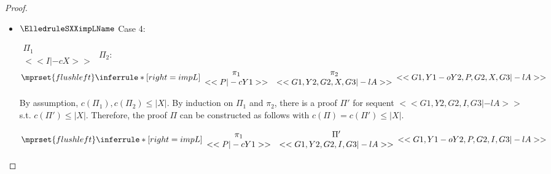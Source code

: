 \begin{proof}
\begin{enumerate}
\begin{itemize}
  \item $\ElledruleSXXimpLName$ Case 4:
      \begin{center}
        \scriptsize
        \begin{math}
          \begin{array}{c}
            \Pi_1 \\
            {<<I |-c X>>}
          \end{array}
        \end{math}
        \qquad\qquad
        $\Pi_2$:
        \begin{math}
          $$\mprset{flushleft}
          \inferrule* [right={\tiny impL}] {
            {
              \begin{array}{cc}
                \pi_1 & \pi_2 \\
                {<<P |-c Y1>>} & {<<G1, Y2, G2, X, G3 |-l A>>}
              \end{array}
            }
          }{<<G1, Y1 -o Y2, P, G2, X, G3 |-l A>>}
        \end{math}
      \end{center}
      By assumption, $c(\Pi_1),c(\Pi_2)\leq |X|$. By induction on $\Pi_1$ and $\pi_2$, there is
      a proof $\Pi'$ for sequent $<<G1, Y2, G2, I, G3 |-l A>>$ s.t. $c(\Pi') \leq |X|$.
      Therefore, the proof $\Pi$ can be constructed as follows with
      $c(\Pi) = c(\Pi') \leq |X|$.
      \begin{center}
        \scriptsize
        \begin{math}
          $$\mprset{flushleft}
          \inferrule* [right={\tiny impL}] {
            {
              \begin{array}{cc}
                \pi_1 & \Pi' \\
                {<<P |-c Y1>>} & {<<G1, Y2, G2, I, G3 |-l A>>}
              \end{array}
            }
          }{<<G1, Y1 -o Y2, P, G2, I, G3 |-l A>>}
        \end{math}
      \end{center}


\end{itemize}
\end{enumerate}
\end{proof}
